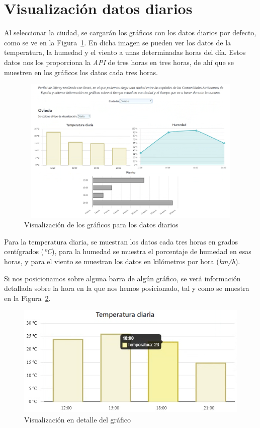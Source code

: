 \documentclass[a4paper, 12pt]{book}
\begin{document}
\section{Visualización datos diarios}
\label{sec:visualizacion-diaria}
Al seleccionar la ciudad, se cargarán los gráficos con los datos diarios por defecto, como se ve en la Figura~\ref{fig:pantalla_diaria}. En dicha imagen se pueden ver los datos de la temperatura, la humedad y el viento a unas determinadas horas del día. Estos datos nos los proporciona la \textit{API} de tres horas en tres horas, de ahí que se muestren en los gráficos los datos cada tres horas.
\begin{figure}[h]
  \centering
  \includegraphics[width=13cm, height=7cm]{img_usadas/pantalla_diaria.png}
  \caption{Visualización de los gráficos para los datos diarios}
  \label{fig:pantalla_diaria}
\end{figure}

\vspace{5mm}
Para la temperatura diaria, se muestran los datos cada tres horas en grados centígrados (\textit{ºC}), para la humedad se muestra el porcentaje de humedad en esas horas, y para el viento se muestran los datos en kilómetros por hora (\textit{km/h}).

\vspace{5mm}
Si nos posicionamos sobre alguna barra de algún gráfico, se verá información detallada sobre la hora en la que nos hemos posicionado, tal y como se muestra en la Figura~\ref{fig:detalle_chart}.
\begin{figure}[h]
  \centering
  \includegraphics{img_usadas/detalle_chart.png}
  \caption{Visualización en detalle del gráfico}
  \label{fig:detalle_chart}
\end{figure}
\end{document}
